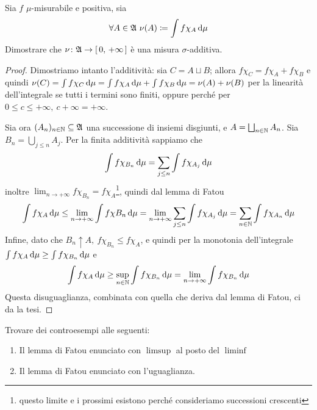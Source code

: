 \documentclass[../EserciziIstituzioniAnalisi.tex]{subfiles}
\begin{document}
\begin{exercise}[28/10/2017]
  Sia $f$ $\mu$-misurabile e positiva, sia
  \begin{equation*}
    \forall A \in \gA\ \nu(A)\coloneqq \int f \chi_A \de \mu
  \end{equation*}
  Dimostrare che $\nu\colon\mathfrak A\rightarrow \left[\,0,\,+\infty\,\right]$ è una misura $\sigma$-additiva.
\end{exercise}
\begin{proof}
  Dimostriamo intanto l'additività: sia $C=A\sqcup B$; allora $f\chi_C=f\chi_A+f\chi_B$ e quindi $\nu(C)=\int f\chi_C \,\mathrm d \mu=\int f\chi_A \,\mathrm d \mu +\int f\chi_B \,\mathrm d \mu=\nu(A)+\nu(B)$ per la linearità dell'integrale se tutti i termini sono finiti, oppure perché per $0\leq c\leq +\infty,\ c+\infty=+\infty$.
  
  Sia ora $(A_n)_{n \in \mathbb N}\subseteq \mathfrak A$ una successione di insiemi disgiunti, e $A=\bigsqcup_{n\in\mathbb N}A_n$. Sia $B_n=\bigcup_{j\leq n}A_j$. Per la finita additività sappiamo che
  \begin{equation*}
    \int f\chi_{B_n} \,\mathrm d \mu=\sum_{j\leq n} \int f \chi_{A_j} \,\mathrm d \mu
  \end{equation*}
  inoltre $\lim_{n\to +\infty} f\chi_{B_n}=f\chi_A$\footnote{questo limite e i prossimi esistono perché consideriamo successioni crescenti}, quindi dal lemma di Fatou
  \begin{equation*}
    \int f\chi_A \,\mathrm d \mu\leq \lim_{n \to +\infty} \int f\chi{B_n} \,\mathrm d \mu=\lim_{n\to +\infty} \sum_{j\leq n} \int f \chi_{A_j} \,\mathrm d \mu=\sum_{n\in \mathbb N} \int f \chi_{A_n} \,\mathrm d \mu
  \end{equation*}
  Infine, dato che $B_n\uparrow A,\ f\chi_{B_n}\leq f\chi_A$, e quindi per la monotonia dell'integrale $\int f \chi_A \,\mathrm d \mu \geq \int f\chi_{B_n}\,\mathrm d \mu$ e
  \begin{equation*}
    \int f \chi_A \,\mathrm d \mu \geq \sup_{n\in\mathbb N} \int f\chi_{B_n} \,\mathrm d \mu = \lim_{n\to +\infty} \int f\chi_{B_n} \,\mathrm d \mu
  \end{equation*}
  Questa disuguaglianza, combinata con quella che deriva dal lemma di Fatou, ci da la tesi.  
\end{proof}
\begin{exercise}[3/11/2016]
  Trovare dei controesempi alle seguenti:
  \begin{enumerate}
    \item Il lemma di Fatou enunciato con $\limsup$ al posto del $\liminf$
    \item Il lemma di Fatou enunciato con l'uguaglianza.
  \end{enumerate}
\end{exercise}
\end{document}
